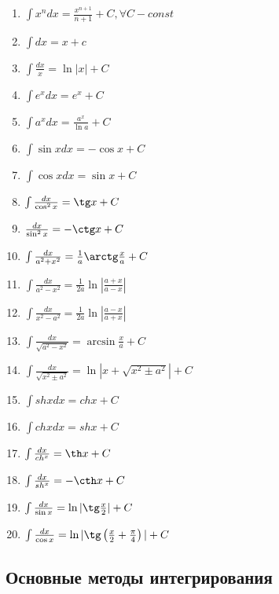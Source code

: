 \begin{enumerate}
    \item $\int x^n dx = \frac{x^{n+1}}{n+1} + C, \forall C - const$ 
    \item $\int dx = x + c$ 
    \item $\int \frac{dx}{x} = \ln |x| + C$
    \item $\int e^x dx = e^x + C$
    \item $\int a^x dx = \frac{a^x}{\ln a} + C$
    \item $\int \sin x dx = -\cos x + C$
    \item $\int \cos x dx = \sin x + C$
    \item $\int \frac{dx}{ \cos^2 x} = \tg x + C$
    \item $\frac{dx}{ \sin^2 x} = -\ctg x + C$ 
    \item $\int \frac{dx}{a^2 + x^2} = \frac{1}{a} \arctg \frac{x}{a} + C$ 
    \item $\int \frac{dx}{a^2 - x^2} = \frac{1}{2a} \ln \left| \frac{a + x}{a - x} \right|$
    \item $\int \frac{dx}{x^2 - a^2} = \frac{1}{2a} \ln \left| \frac{a - x}{a + x} \right|$
    \item $\int \frac{dx}{\sqrt{a^2 - x^2} } = \arcsin \frac{x}{a} + C $
    \item $\int \frac{dx}{\sqrt{x^2 \pm a^2} } = \ln |x + \sqrt{x^2 \pm a^2} | + C $
    \item $\int sh x dx = ch x + C$
    \item $\int ch x dx = sh x + C$
    \item $\int \frac{dx}{ch^x} = \th x + C$
    \item $\int \frac{dx}{sh^x} = -\cth x + C$ 
    \item $\int \frac{dx}{\sin x} = \ln |\tg \frac{x}{2}| + C $
    \item $\int \frac{dx}{\cos x} = \ln |\tg \left( \frac{x}{2} + \frac{\pi}{4} \right) | + C$
\end{enumerate}

\subsection{Основные методы интегрирования}

